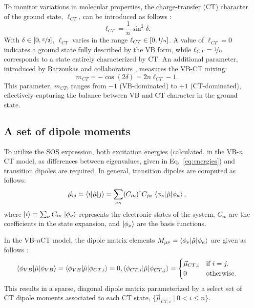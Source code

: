 \documentclass[12pt,a4paper]{article}
\begin{document}
To monitor variations in molecular properties, the charge-transfer (CT) character of the ground state, $\ell_{CT}$, can be introduced as follows \cite{choNonlinearOpticalProperties2002,choElementaryDescriptionNonlinear1998,yangLargeOffDiagonalContribution2003}:
\begin{equation}
	\ell_{CT} = \frac{1}{n} \sin^2 \delta.
\end{equation}
With $\delta \in [0, \nicefrac{\pi}{2}]$, $\ell_{CT}$ varies in the range $\ell_{CT} \in [0, \nicefrac{1}{n}]$. A value of $\ell_{CT} = 0$ indicates a ground state fully described by the VB form, while $\ell_{CT} = \nicefrac{1}{n}$ corresponds to a state entirely characterized by CT. 
An additional parameter, introduced by Barzoukas and collaborators \cite{barzoukasTWOFORMDESCRIPTIONPUSHPULL1996,barzoukasTwostateDescriptionHyper1996,blanchard-desceTwoformTwostateAnalysis1998a}, measures the VB-CT mixing:
\begin{equation}
	m_{CT} = -\cos(2\delta) = 2n \ell_{CT} - 1.
\end{equation} 
This parameter, $m_{CT}$, ranges from $-1$ (VB-dominated) to $+1$ (CT-dominated), effectively capturing the balance between VB and CT character in the ground state.

\subsection{A set of dipole moments}\label{sec:dipoles}

To utilize the SOS expression, both excitation energies (calculated, in the VB-$n$CT model, as differences between eigenvalues, given in Eq.~\eqref{eq:energies}) and transition dipoles are required. In general, transition dipoles are computed as follows:
\begin{equation}
	\vec{\mu}_{ij} = \braket{i | \hat{\mu} | j} = \sum_{\nu \kappa} (C_{i \nu})^\dagger C_{j \kappa} \, \braket{\phi_\nu | \hat{\mu} | \phi_\kappa},
\end{equation}
where $\ket{i} = \sum_\nu C_{i \nu} \, \ket{\phi_\nu}$ represents the electronic states of the system, $C_{i \nu}$ are the coefficients in the state expansion, and $\ket{\phi_\nu}$ are the basis functions. 

In the VB-$n$CT model, the dipole matrix elements $M_{\mu \nu} = \braket{\phi_\nu | \hat{\mu} | \phi_\kappa}$ are given as follows \cite{luValenceBondChargeTransferModel1994}:
\begin{align}
	\braket{\phi_{VB} | \hat{\mu} | \phi_{VB}} = \braket{\phi_{VB} | \hat{\mu} | \phi_{CT,i}} = 0,
	\braket{\phi_{CT,i} | \hat{\mu} | \phi_{CT,j}} = 
	\begin{cases}
		\vec{\mu}_{CT,i} & \text{if } i = j, \\
		0 & \text{otherwise}.
	\end{cases}
\end{align}
This results in a sparse, diagonal dipole matrix parameterized by a select set of CT dipole moments associated to each CT state, $\{\vec{\mu}_{CT,i} \mid 0 < i \leq n\}$.
\end{document}

